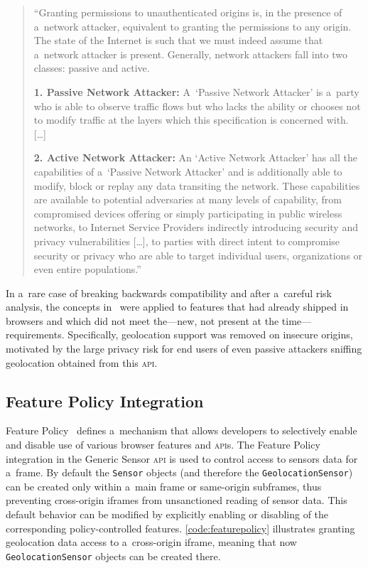 \documentclass[sigconf,hyphens]{acmart}
\begin{document}
\begin{quote}
``Granting permissions to unauthenticated origins is, in the presence of a~network attacker,
equivalent to granting the permissions to any origin.
The state of the Internet is such that we must indeed assume that a~network attacker is present.
Generally, network attackers fall into two classes: passive and active.

\textbf{1. Passive Network Attacker:} A~`Passive Network Attacker' is a~party
who is able to observe traffic flows but who lacks the ability
or chooses not to modify traffic at the layers which this specification is concerned with. [\ldots]

\textbf{2. Active Network Attacker:} An `Active Network Attacker' has all the capabilities
of a~`Passive Network Attacker' and is additionally able to modify, block or replay
any data transiting the network.
These capabilities are available to potential adversaries at many levels of capability,
from compromised devices offering or simply participating in public wireless networks,
to Internet Service Providers indirectly introducing security and privacy vulnerabilities [\ldots],
to parties with direct intent to compromise security or privacy who are able to target individual
users, organizations or even entire populations.''
\end{quote}

In a~rare case of breaking backwards compatibility and after a~careful risk analysis,
the concepts in~\cite{west2016securecontexts} were applied
to features that had already shipped in browsers
and which did not meet the---new, not present at the time---requirements.
Specifically, geolocation support was removed on insecure origins,
motivated by the large privacy risk for end users of even passive attackers
sniffing geolocation obtained from this \textsc{api}.

\subsection{Feature Policy Integration}

Feature Policy~\cite{clelland2019featurepolicy} defines a~mechanism that allows developers
to selectively enable and disable use of various browser features and \textsc{api}s.
The Feature Policy integration in the Generic Sensor \textsc{api}
is used to control access to sensors data for a~frame.
By default the \texttt{Sensor} objects (and therefore the \texttt{GeolocationSensor})
can be created only within a~main frame or same-origin subframes,
thus preventing cross-origin iframes from unsanctioned reading of sensor data.
This default behavior can be modified by explicitly enabling or disabling
of the corresponding policy-controlled features.
\autoref{code:featurepolicy} illustrates granting geolocation data access to a~cross-origin iframe,
meaning that now \texttt{GeolocationSensor} objects can be created there.
\end{document}
